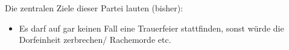 Die zentralen Ziele dieser Partei lauten (bisher):
\begin{itemize}
  \item Es darf auf gar keinen Fall eine Trauerfeier stattfinden, sonst würde
    die Dorfeinheit zerbrechen/ Rachemorde etc.
\end{itemize}
